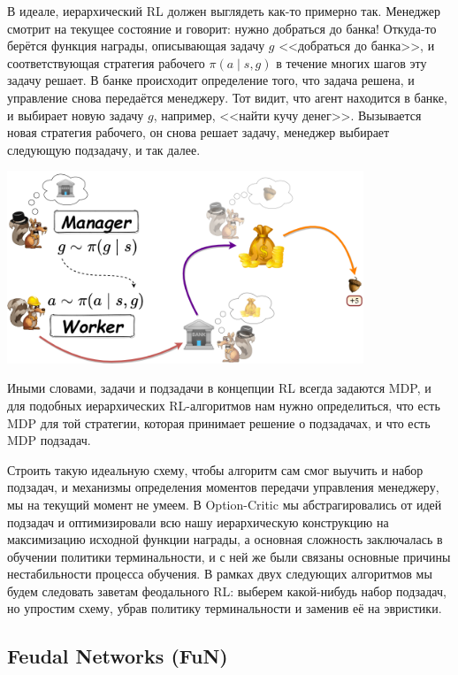 \begin{example}
В идеале, иерархический RL должен выглядеть как-то примерно так. Менеджер смотрит на текущее состояние и говорит: нужно добраться до банка! Откуда-то берётся функция награды, описывающая задачу $g$ <<добраться до банка>>, и соответствующая стратегия рабочего $\pi(a \mid s, g)$ в течение многих шагов эту задачу решает. В банке происходит определение того, что задача решена, и управление снова передаётся менеджеру. Тот видит, что агент находится в банке, и выбирает новую задачу $g$, например, <<найти кучу денег>>. Вызывается новая стратегия рабочего, он снова решает задачу, менеджер выбирает следующую подзадачу, и так далее.

\begin{center}
    \includegraphics[width=0.8\textwidth]{Images/HRL4}
\end{center}
\end{example}

Иными словами, задачи и подзадачи в концепции RL всегда задаются MDP, и для подобных иерархических RL-алгоритмов нам нужно определиться, что есть MDP для той стратегии, которая принимает решение о подзадачах, и что есть MDP подзадач.

Строить такую идеальную схему, чтобы алгоритм сам смог выучить и набор подзадач, и механизмы определения моментов передачи управления менеджеру, мы на текущий момент не умеем. В Option-Critic мы абстрагировались от идей подзадач и оптимизировали всю нашу иерархическую конструкцию на максимизацию исходной функции награды, а основная сложность заключалась в обучении политики терминальности, и с ней же были связаны основные причины нестабильности процесса обучения. В рамках двух следующих алгоритмов мы будем следовать заветам феодального RL: выберем какой-нибудь набор подзадач, но упростим схему, убрав политику терминальности и заменив её на эвристики.

\subsection{Feudal Networks (FuN)}


